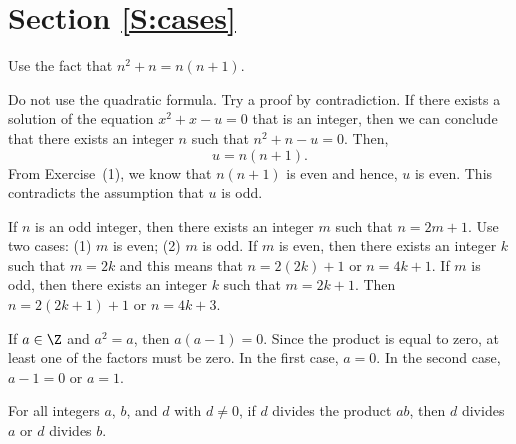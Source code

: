 \section*{Section \ref{S:cases}}
\renewcommand{\labelenumi}{(\textbf{\alph{enumi}})}

\begin{list}{\bf{\ref{exer:consecutive}.}}
\item Use the fact that $n^2 + n = n ( n+1 )$.
\end{list}


\begin{list}{\bf{\ref{exer:sec33-6}.}}
\item Do not use the quadratic formula.  Try a proof by contradiction.  If there exists a  solution of the equation $x^2 + x - u = 0$ that is an integer, then we can conclude that there exists an integer $n$ such that $n^2 + n - u = 0$.  Then,
\[
u = n \left( n + 1 \right).
\]
From Exercise~(1), we know that $n(n + 1)$ is even and hence, $u$ is even.  This contradicts the assumption that $u$ is odd.
\end{list}

\begin{list}{\bf{\ref{exer:sec35-5}.}}
\item If $n$ is an odd integer, then there exists an integer $m$ such that $n = 2m + 1$.  Use two cases: (1) $m$ is even; (2) $m$ is odd.  If $m$ is even, then there exists an integer $k$ such that $m = 2k$ and this means that $n = 2(2k) + 1$ or $n = 4k + 1$.  If $m$ is odd, then there exists an integer $k$ such that $m = 2k + 1$.  Then $n = 2(2k + 1) + 1$ or $n = 4k + 3$.
\end{list}


\begin{list}{\bf{\ref{exer:sec34-quadratic}.}}
\item If $a \in \Z$ and $a^2 = a$, then $a(a - 1) = 0$.  Since the product is equal to zero, at least one of the factors must be zero.  In the first case, $a = 0$.  In the second case, 
$a - 1 = 0$ or $a = 1$.
\end{list}

\begin{list}{\bf{\ref{exer:dividesproduct}.}}
\item \begin{list}{\bf{(c)}}
\item For all integers  $a$, $b$, and  $d$  with $d \ne 0$, if  $d$  divides the product  $ab $, then $d$  divides  $a$  or  $d$  divides  $b$.
\end {list}
\end{list}


